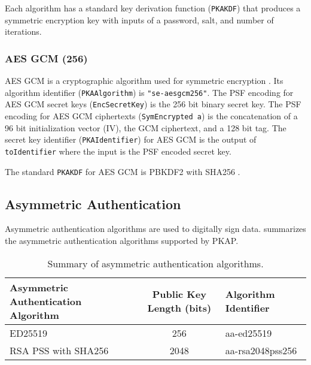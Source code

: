 \documentclass{article}
\newcommand{\pkap}{PKAP}
\newcommand{\todo}[1]{\textcolor{red}{#1}}
\begin{document}
Each algorithm has a standard key derivation function (\texttt{PKAKDF}) that produces a symmetric encryption key with inputs of a password, salt, and number of iterations. 

\subsubsection{AES GCM (256)}

AES GCM is a cryptographic algorithm used for symmetric encryption \cite{aesgcm}. 
Its algorithm identifier (\texttt{PKAAlgorithm}) is \texttt{"se-aesgcm256"}. 
The PSF encoding for AES GCM secret keys (\texttt{EncSecretKey}) is the 256 bit binary secret key. 
The PSF encoding for AES GCM ciphertexts (\texttt{SymEncrypted a}) is the concatenation of a 96 bit initialization vector (IV), the GCM ciphertext, and a 128 bit tag. 
The secret key identifier (\texttt{PKAIdentifier}) for AES GCM is the output of \texttt{toIdentifier} where the input is the PSF encoded secret key. 

The standard \texttt{PKAKDF} for AES GCM is PBKDF2 with SHA256 \cite{rfc2898}.

%


\subsection{Asymmetric Authentication}

Asymmetric authentication algorithms are used to digitally sign data. 
 summarizes the asymmetric authentication algorithms supported by \pkap{}. 

\begin{table}
\begin{center}
\begin{tabular}{| l | c | l |}
\hline
Asymmetric Authentication Algorithm & Public Key Length (bits) & Algorithm Identifier \\ 
\hline
ED25519 & 256 & aa-ed25519 \\
RSA PSS with SHA256 & 2048 & aa-rsa2048pss256 \\ %
\hline
\end{tabular}
\caption{Summary of asymmetric authentication algorithms.}
\label{tabel:asymmetric_auth_alg}
\end{center}
\end{table}
\end{document}
